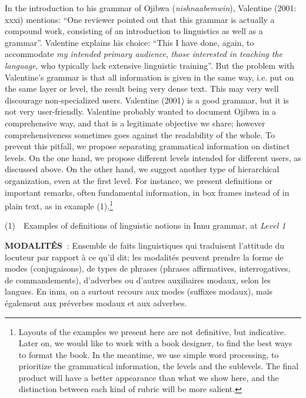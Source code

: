 \documentclass[letterpaper]{article}
\begin{document}
In the introduction to his grammar of Ojibwa (\textit{nishnaabemwin}), Valentine (2001: xxxi) mentions: {\textquotedblleft}One reviewer pointed out that this grammar is actually a compound work, consisting of an introduction to linguistics as well as a grammar{\textquotedblright}. Valentine explains his choice: {\textquotedblleft}This I have done, again, to accommodate \textit{my intended primary audience}, \textit{those interested in teaching the language}, who typically lack extensive linguistic training{\textquotedblright}. But the problem with Valentine{\textquoteright}s grammar is that all information is given in the same way, i.e. put on the same layer or level, the result being very dense text. This may very well discourage non-specialized users. Valentine (2001) is a good grammar, but it is not very user-friendly. Valentine probably wanted to document Ojibwa in a comprehensive way, and that is a legitimate objective we share; however comprehensiveness sometimes goes against the readability of the whole. To prevent this pitfall, we propose separating grammatical information on distinct levels. On the one hand, we propose different levels intended for different users, as discussed above. On the other hand, we suggest another type of hierarchical organization, even at the first level. For instance, we present definitions or important remarks, often fundamental information, in box frames instead of in plain text, as in example (1).\footnote{ Layouts of the examples we present here are not definitive, but indicative. Later on, we would like to work with a book designer, to find the best ways to format the book. In the meantime, we use simple word processing, to prioritize the grammatical information, the levels and the sublevels. The final product will have a better appearance than what we show here, and the distinction between each kind of rubric will be more salient.} 

(1)\ \ Examples of definitions of linguistic notions in Innu grammar, at \textit{Level 1}

\textbf{\textsc{MODALIT\'ES}}\textbf{\textsc{~}}\textsc{: E}nsemble de faits linguistiques qui traduisent l{\textquoteright}attitude du locuteur par rapport \`a ce qu{\textquoteright}il dit; les modalit\'es peuvent prendre la forme de modes (conjugaisons), de types de phrases (phrases affirmatives, interrogatives, de commandements), d{\textquoteright}adverbes ou d{\textquoteright}autres auxiliaires modaux, selon les langues. En innu, on a surtout recours aux modes (suffixes modaux), mais \'egalement aux pr\'everbes modaux et aux adverbes. 
\end{document}
